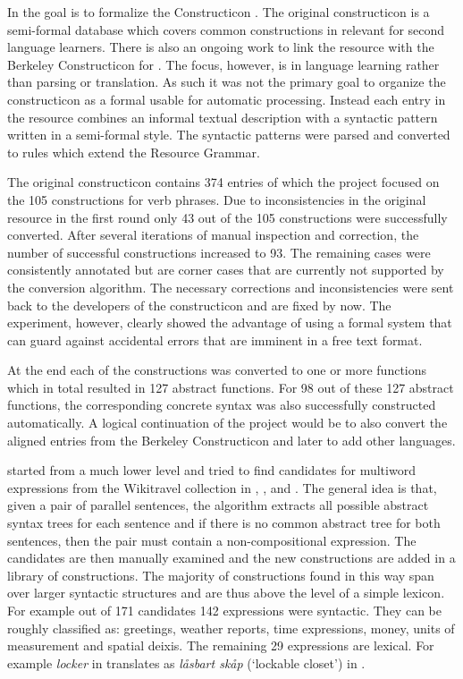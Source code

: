 \documentclass[output=paper]{langsci/langscibook}
\begin{document}
In \cite{gruzitis2015formalising} the goal is to formalize the
 Constructicon \citep{konvens:lyngfelt12w}. 
The original constructicon is a semi-formal 
database which covers common constructions in  relevant for
second language learners. There is also an ongoing work to link 
the resource with the Berkeley Constructicon for  \citep{backstrom}. The focus,
however, is in language learning rather than parsing or translation.
As such it was not the primary goal to organize the constructicon as
a formal  usable for automatic processing. Instead each entry
in the resource combines an informal textual description with 
a syntactic pattern written in a semi-formal style. 
The syntactic patterns were parsed and converted to  rules
which extend the  Resource Grammar.

The original constructicon contains 374 entries of which the project
focused on the 105 constructions for verb phrases. Due to inconsistencies
in the original resource in the first round only 43 out of 
the 105 constructions were successfully converted. 
After several iterations of manual inspection and correction, 
the number of successful constructions increased to 93. The remaining
cases were consistently annotated but are corner cases that are currently
not supported by the conversion algorithm. The necessary corrections
and inconsistencies were sent back to the developers of the constructicon
and are fixed by now. The experiment, however, clearly showed the advantage
of using a formal system that can guard against accidental errors
that are imminent in a free text format.

At the end each of the constructions was converted to one or 
more  functions which in total resulted in 127 abstract functions. 
For 98 out of these 127 abstract functions, the corresponding 
concrete syntax was also successfully constructed automatically.
A logical continuation of the project would be to also convert the
aligned entries from the Berkeley Constructicon and later
to add other languages.

\cite{enache2014handling} started from a much lower level and tried
to find candidates for multiword expressions from 
the Wikitravel  collection
in , ,  and . The general idea is that,
given a pair of parallel sentences, the algorithm extracts all
possible abstract syntax trees for each sentence and if there
is no common abstract tree for both sentences, then the pair must
contain a non-compositional expression. The candidates are then
manually examined and the new constructions are added in a library
of constructions. The majority of constructions found in this way
span over larger syntactic structures and are thus above the level of
a simple lexicon. For example out of 171 candidates 142 expressions
were syntactic. They can be roughly classified as: greetings, weather
reports, time expressions, money, units of measurement and spatial deixis.
The remaining 29 expressions are lexical. For example \textit{locker}
in  translates as \textit{l{\aa}sbart sk{\aa}p} (`lockable closet')
in .
\end{document}
